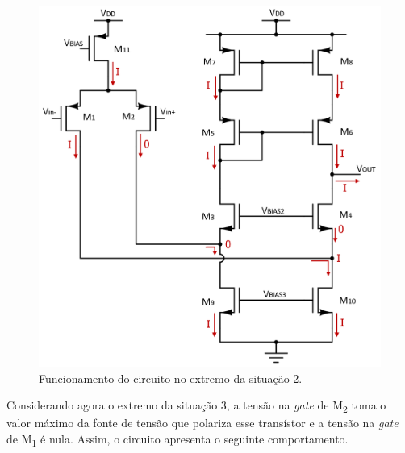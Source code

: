 \documentclass[11pt]{article}
\numberwithin{equation}{section}
\begin{document}
\begin{figure}[H]
	\centering
	\includegraphics[keepaspectratio=true, scale=0.47]{teoricas/situacao2}
	\vspace{-0.5em}
	\caption{Funcionamento do circuito no extremo da situação 2.}
	\vspace{-0.8em}
\end{figure} 

Considerando agora o extremo da situação 3, a tensão na \textit{gate} de M\textsubscript{2} toma o valor máximo da fonte de tensão que polariza esse transístor e a tensão na \textit{gate} de M\textsubscript{1} é nula. Assim, o circuito apresenta o seguinte comportamento.
\end{document}
